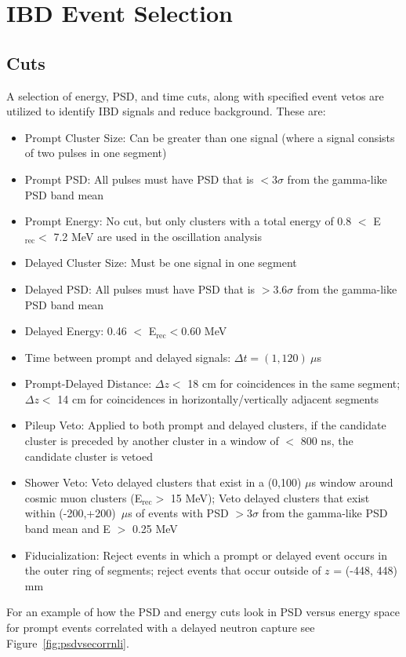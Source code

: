 \section{IBD Event Selection}

\subsection{Cuts}

A selection of energy, PSD, and time cuts, along with specified event vetos are utilized to identify IBD signals and reduce background.
These are:
\begin{itemize}
	\item Prompt Cluster Size: Can be greater than one signal (where a signal consists of two pulses in one segment)
	\item Prompt PSD: All pulses must have PSD that is $<3\sigma$ from the gamma-like PSD band mean
	\item Prompt Energy: No cut, but only clusters with a total energy of 0.8 $<$ E$_{\textrm{rec}} <$ 7.2 MeV are used in the oscillation analysis
	\item Delayed Cluster Size: Must be one signal in one segment
	\item Delayed PSD: All pulses must have PSD that is $>3.6\sigma$ from the gamma-like PSD band mean
	\item Delayed Energy: 0.46 $<$ E$_{\textrm{rec}} < $0.60 MeV
	\item Time between prompt and delayed signals: $\Delta t = (1,120)~\mu$s
	\item Prompt-Delayed Distance: $\Delta z <$ 18 cm for coincidences in the same segment; $\Delta z <$ 14 cm for coincidences in horizontally/vertically adjacent segments
	\item Pileup Veto: Applied to both prompt and delayed clusters, if the candidate cluster is preceded by another cluster in a window of $<$ 800 ns, the candidate cluster is vetoed
	\item Shower Veto: Veto delayed clusters that exist in a (0,100) $\mu$s window around cosmic muon clusters (E$_{\textrm{rec}} >$ 15 MeV); Veto delayed clusters that exist within (-200,+200)~$\mu$s of events with PSD $> 3\sigma$ from the gamma-like PSD band mean and E $>$ 0.25 MeV
	\item Fiducialization: Reject events in which a prompt or delayed event occurs in the outer ring of segments; reject events that occur outside of $z$ = (-448, 448) mm 
\end{itemize}
For an example of how the PSD and energy cuts look in PSD versus energy space for prompt events correlated with a delayed neutron capture see Figure~\ref{fig:psdvsecorrnli}.

